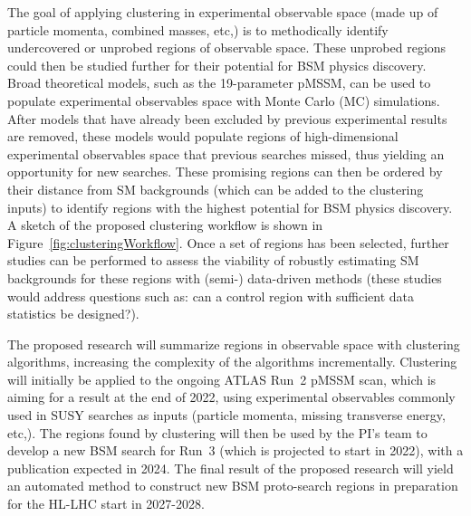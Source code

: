 \documentclass[letter, USenglish, 11pt, subfigure]{article}
\begin{document}
The goal of applying clustering in experimental observable space (made up of particle momenta, combined masses, etc,) is to methodically identify undercovered or unprobed regions of observable space. These unprobed regions could then be studied further for their potential for BSM physics discovery. Broad theoretical models, such as the 19-parameter pMSSM, can be used to populate experimental observables space with Monte Carlo (MC) simulations. After models that have already been excluded by previous experimental results are removed, these models would populate regions of high-dimensional experimental observables space that previous searches missed, thus yielding an opportunity for new searches. These promising regions can then be ordered by their distance from SM backgrounds (which can be added to the clustering inputs) to identify regions with the highest potential for BSM physics discovery.  A sketch of the proposed clustering workflow is shown in Figure~\ref{fig:clusteringWorkflow}. Once a set of regions has been selected, further studies can be performed to assess the viability of robustly estimating SM backgrounds for these regions with (semi-) data-driven methods (these studies would address questions such as: can a control region with sufficient data statistics be designed?).

The proposed research will summarize regions in observable space with clustering algorithms, increasing the complexity of the algorithms incrementally. Clustering will initially be applied to the ongoing ATLAS Run~2 pMSSM scan, which is aiming for a result at the end of 2022, using experimental observables commonly used in SUSY searches as inputs (particle momenta, missing transverse energy, etc,). The regions found by clustering will then be used by the PI's team to develop a new BSM search for Run~3 (which is projected to start in 2022), with a publication expected in 2024. The final result of the proposed research will yield an automated method to construct new BSM proto-search regions in preparation for the HL-LHC start in 2027-2028.
\end{document}
